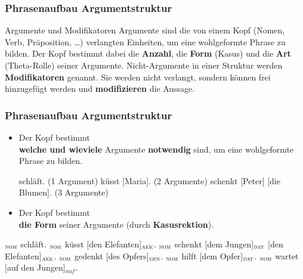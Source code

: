 \begin{frame}
\frametitle{Phrasenaufbau \ras Argumentstruktur}

\begin{block}{Argumente und Modifikatoren}
Argumente sind die von einem Kopf (Nomen, Verb, Präposition, \dots ) verlangten Einheiten, um eine wohlgeformte Phrase zu bilden. Der Kopf bestimmt dabei die \textbf{Anzahl}, die \textbf{Form} (\zB Kasus) und die \textbf{Art} (\zB Theta-Rolle) seiner Argumente. Nicht-Argumente in einer Struktur werden \textbf{Modifikatoren} genannt. Sie werden nicht verlangt, sondern können frei hinzugefügt werden und \textbf{modifizieren} die Aussage. 
\end{block}

\end{frame}


\begin{frame}
\frametitle{Phrasenaufbau \ras Argumentstruktur}

\begin{itemize}
	\item Der Kopf bestimmt\\ 
	\textbf{welche und wieviele} Argumente \textbf{notwendig} sind, um eine wohlgeformte Phrase zu bilden.


\eal 
\ex [Peter] schläft. \hfill (1 Argument)
\ex [Peter] küsst [Maria]. \hfill (2 Argumente)
\ex [Maria] schenkt [Peter] [die Blumen]. \hfill (3 Argumente)
\zl

\pause

\eal
{}
\zl


\end{itemize}
\end{frame}


\begin{frame}

\begin{itemize}
	\item Der Kopf bestimmt\\ 
	\textbf{die Form} seiner Argumente (\zB durch \textbf{Kasusrektion}).
\end{itemize}

\eal 
{}$_{\textsc{nom}}$ schläft.
$_{\textsc{nom}}$ küsst [den Elefanten]$_{\textsc{akk}}$.
$_{\textsc{nom}}$ schenkt [dem Jungen]$_{\textsc{dat}}$ [den Elefanten]$_{\textsc{akk}}$.
$_{\textsc{nom}}$ gedenkt [des Opfers]$_{\textsc{gen}}$.
$_{\textsc{nom}}$ hilft [dem Opfer]$_{\textsc{dat}}$.
$_{\textsc{nom}}$ wartet [auf den Jungen]$_{auf}$.
\zl

\pause

\eal
{}
\zl

\end{frame}


